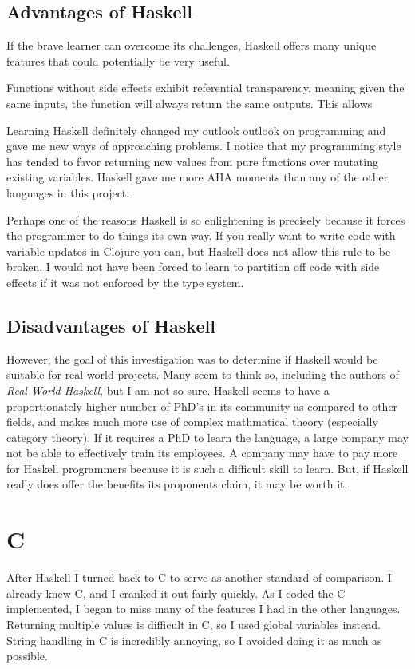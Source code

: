 \documentclass{article}
\begin{document}
\subsection{Advantages of Haskell}

If the brave learner can overcome its challenges, Haskell offers many unique
features that could potentially be very useful.  

Functions without side effects exhibit referential transparency, meaning given
the same inputs, the function will always return the same outputs.  This allows 

Learning Haskell definitely changed my outlook outlook on programming and gave
me new ways of approaching problems.  I notice that my programming style has
tended to favor returning new values from pure functions over mutating existing
variables.  Haskell gave me more AHA moments than any of the other languages in
this project.

Perhaps one of the reasons Haskell is so enlightening is precisely because it
forces the programmer to do things its own way.  If you really want to write
code with variable updates in Clojure you can, but Haskell does not allow this
rule to be broken.  I would not have been forced to learn to partition off code
with side effects if it was not enforced by the type system.

\subsection{Disadvantages of Haskell}

However, the goal of this investigation was to determine if Haskell would be
suitable for real-world projects.  Many seem to think so, including the authors
of \emph{Real World Haskell}, but I am not so sure.  Haskell seems to have
a proportionately higher number of PhD's in its community as compared to other
fields, and makes much more use of complex mathmatical theory (especially
category theory).  If it requires a PhD to learn the language, a large company
may not be able to effectively train its employees.  A company may have to pay
more for Haskell programmers because it is such a difficult skill to learn.
But, if Haskell really does offer the benefits its proponents claim, it may be
worth it.

\section{C}

After Haskell I turned back to C to serve as another standard of comparison.
I already knew C, and I cranked it out fairly quickly.  As I coded the C
implemented, I began to miss many of the features I had in the other languages.
Returning multiple values is difficult in C, so I used global variables instead.
String handling in C is incredibly annoying, so I avoided doing it as much as
possible.
\end{document}
